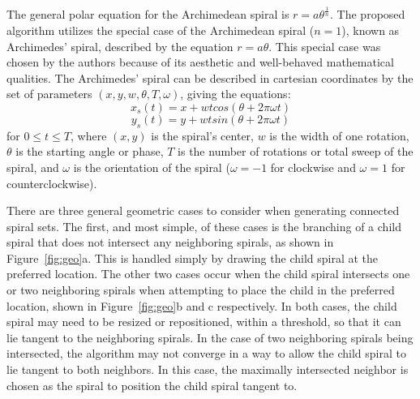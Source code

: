 \documentclass[11pt]{article}
\begin{document}
	The general polar equation for the Archimedean spiral is \begin{math}r = a\theta^\frac{1}{n}\end{math}. The proposed algorithm utilizes the special case of the Archimedean spiral (\begin{math}n=1\end{math}), known as Archimedes' spiral, described by the equation \begin{math}r = a\theta\end{math}. This special case was chosen by the authors because of its aesthetic and well-behaved mathematical qualities. The Archimedes' spiral can be described in cartesian coordinates by the set of parameters \begin{math}(x,y,w,\theta,T,\omega)\end{math}, giving the equations:
	\begin{equation}x_{s}(t) = x + wt cos(\theta + 2\pi\omega t)\end{equation}
	\begin{equation}y_{s}(t) = y + wt sin(\theta + 2\pi\omega t)\end{equation}
for \begin{math}0 \leq t \leq T\end{math}, where \begin{math}(x,y)\end{math} is the spiral's center, \begin{math}w\end{math} is the width of one rotation, \begin{math}\theta\end{math} is the starting angle or phase, \begin{math}T\end{math} is the number of rotations or total sweep of the spiral, and \begin{math}\omega\end{math} is the orientation of the spiral (\begin{math}\omega = -1\end{math} for clockwise and \begin{math}\omega = 1\end{math} for counterclockwise).

	There are three general geometric cases to consider when generating connected spiral sets. The first, and most simple, of these cases is the branching of a child spiral that does not intersect any neighboring spirals, as shown in Figure~\ref{fig:geo}a. This is handled simply by drawing the child spiral at the preferred location. The other two cases occur when the child spiral intersects one or two neighboring spirals  when attempting to place the child in the preferred location, shown in Figure~\ref{fig:geo}b and c respectively. In both cases, the child spiral may need to be resized or repositioned, within a threshold, so that it can lie tangent to the neighboring spirals. In the case of two neighboring spirals being intersected, the algorithm may not converge in a way to allow the child spiral to lie tangent to both neighbors. In this case, the maximally intersected neighbor is chosen as the spiral to position the child spiral tangent to.
\end{document}
